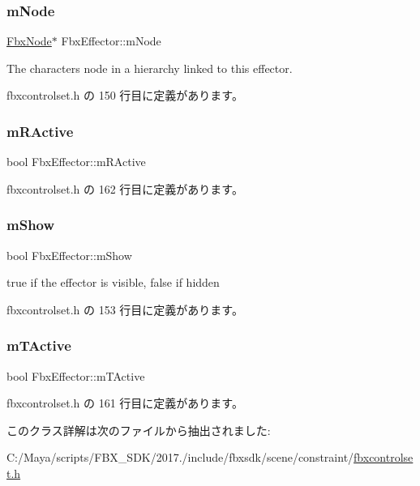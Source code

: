 \subsubsection{\texorpdfstring{m\+Node}{mNode}}
{\footnotesize\ttfamily \hyperlink{class_fbx_node}{Fbx\+Node}$\ast$ Fbx\+Effector\+::m\+Node}



The character\textquotesingle{}s node in a hierarchy linked to this effector. 



 fbxcontrolset.\+h の 150 行目に定義があります。

\mbox{\label{class_fbx_effector_a6a37a72600a06dba114a47d6c98731c7}} 
\subsubsection{\texorpdfstring{m\+R\+Active}{mRActive}}
{\footnotesize\ttfamily bool Fbx\+Effector\+::m\+R\+Active}



 fbxcontrolset.\+h の 162 行目に定義があります。

\mbox{\label{class_fbx_effector_aea6c24780611a7878ed22d9358715e25}} 
\subsubsection{\texorpdfstring{m\+Show}{mShow}}
{\footnotesize\ttfamily bool Fbx\+Effector\+::m\+Show}



{\ttfamily true} if the effector is visible, {\ttfamily false} if hidden 



 fbxcontrolset.\+h の 153 行目に定義があります。

\mbox{\label{class_fbx_effector_ab4cb3feccf5586307ec12f9c208d256b}} 
\subsubsection{\texorpdfstring{m\+T\+Active}{mTActive}}
{\footnotesize\ttfamily bool Fbx\+Effector\+::m\+T\+Active}



 fbxcontrolset.\+h の 161 行目に定義があります。



このクラス詳解は次のファイルから抽出されました\+:\begin{DoxyCompactItemize}
\item 
C\+:/\+Maya/scripts/\+F\+B\+X\+\_\+\+S\+D\+K/2017./include/fbxsdk/scene/constraint/\hyperlink{fbxcontrolset_8h}{fbxcontrolset.\+h}\end{DoxyCompactItemize}
